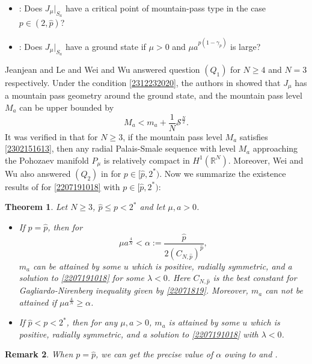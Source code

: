 \documentclass[10pt]{article}
\numberwithin{equation}{section}
\newtheorem{theorem}{Theorem}[section]
\newtheorem{remark}[theorem]{Remark}
\numberwithin{equation}{section}
\begin{document}
\begin{itemize}
\item[($Q_1$)]: Does $J_{\mu}|_{S_a}$ have a critical point of mountain-pass type in the case $p\in (2, \hat{p})$?
\item[($Q_2$)]: Does $J_{\mu}|_{S_a}$ have a ground state if $\mu>0$ and $ \mu a^{{p(1-\gamma_p)}}$ is large?
\end{itemize}
Jeanjean and Le \cite{JL2022} and Wei and Wu \cite{WW22} answered question $(Q_1)$ for $N\ge 4$ and $N=3$ respectively. Under the condition \eqref{2312232020}, the authors in \cite{JL2022, WW22} showed that $J_{\mu}$ has a mountain pass geometry around the ground state, and the mountain pass level $M_a$ can be upper bounded by
\begin{equation}\label{2302151613}
M_a<m_a+\frac{1}{N}\mathcal{S}^{\frac{N}{2}}.
\end{equation}
It was verified in \cite[Proposition 1.11]{JL2022} that for $N\ge 3$, if the mountain pass level $M_a$ satisfies \eqref{2302151613}, then any radial Palais-Smale sequence with level $M_a$ approaching the Pohozaev manifold $P_{\mu}$ is relatively compact in $H^1(\mathbb{R}^N)$. Moreover, Wei and Wu also answered $(Q_2)$ in \cite{WW22} for $p\in [\hat{p}, 2^*)$. Now we summarize the existence results of \cite{Soave20_JFA, WW22} for \eqref{2207191018} with $p\in [\hat{p}, 2^*)$:
\begin{theorem}\label{2207231547}
Let $N\ge 3$, $\hat{p}\le p<2^*$ and let $\mu, a>0$.
\begin{itemize}
\item[$(i)$] If $p=\hat{p}$, then for
$$\mu a^{\frac4N}< \alpha:= \frac{\hat{p}}{2(C_{N,\hat{p}})^{\hat{p}}},$$
$m_a$ can be attained by some $u$ which is positive, radially symmetric, and a solution to \eqref{2207191018} for some $\lambda<0$. Here $C_{N, \hat{p}}$ is the best constant for Gagliardo-Nirenberg inequality given by \eqref{22071819}. Moreover, $m_a$ can not be attained if $\mu a^{\frac4N}\ge \alpha$.
\item[$(ii)$] If $\hat{p}<p<2^*$, then for any $\mu, a>0$, $m_{a}$ is attained by some $u$ which is positive, radially symmetric, and a solution to \eqref{2207191018} with $\lambda<0$.
\end{itemize}
\end{theorem}
\begin{remark}\label{2302021620}
When $p=\hat{p}$, we can get the precise value of $\alpha$ owing to \cite[(5.1)]{Soave20_JFA} and \cite[(3.13)]{WW22}.
\end{remark}
\end{document}
